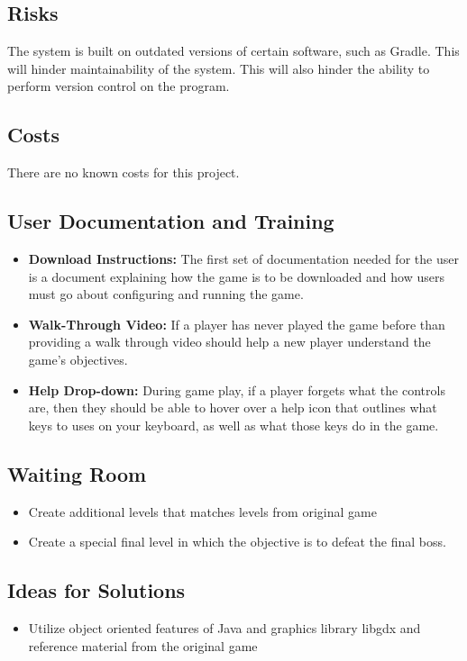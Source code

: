 \documentclass[12pt, titlepage]{article}
\begin{document}
\subsection{Risks}

The system is built on outdated versions of certain software, such as Gradle. This will hinder maintainability of the system. This will also hinder the ability to perform version control on the program.

\subsection{Costs}

There are no known costs for this project.

\subsection{User Documentation and Training}
\begin{itemize}
    \item \textbf{Download Instructions:} The first set of documentation needed for the user is a document explaining how the game is to be downloaded and how users must go about configuring and running the game.
    \item \textbf{Walk-Through Video:} If a player has never played the game before than providing a walk through video should help a new player understand the game's objectives.
    \item \textbf{Help Drop-down:} During game play, if a player forgets what the controls are, then they should be able to hover over a help icon that outlines what keys to uses on your keyboard, as well as what those keys do in the game.

\end{itemize}
\subsection{Waiting Room}
\begin{itemize}
    \item Create additional levels that matches levels from original game
    \item Create a special final level in which the objective is to defeat the final boss.
\end{itemize}

\subsection{Ideas for Solutions}
\begin{itemize}
    \item Utilize object oriented features of Java and graphics library libgdx and reference material from the original game
\end{itemize}
\end{document}
